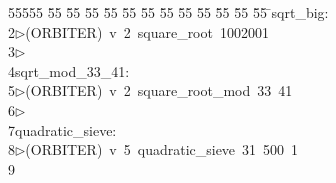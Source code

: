 %
%
\begin{tabbing}
55555 \= 55 \= 55 \= 55 \= 55 \= 55 \= 55 \= 55 \= 55 \= 55 \= 55 \= 55 \= 55 \= \>sqrt\_big:\\[0pt]
2\>$\triangleright$\>(ORBITER)\ v\ 2\ square\_root\ 1002001\\[0pt]
3\>$\triangleright$\>\\[0pt]
4\>sqrt\_mod\_33\_41:\\[0pt]
5\>$\triangleright$\>(ORBITER)\ v\ 2\ square\_root\_mod\ 33\ 41\\[0pt]
6\>$\triangleright$\>\\[0pt]
7\>quadratic\_sieve:\\[0pt]
8\>$\triangleright$\>(ORBITER)\ v\ 5\ quadratic\_sieve\ 31\ 500\ 1\\[0pt]
9\>\end{tabbing}
